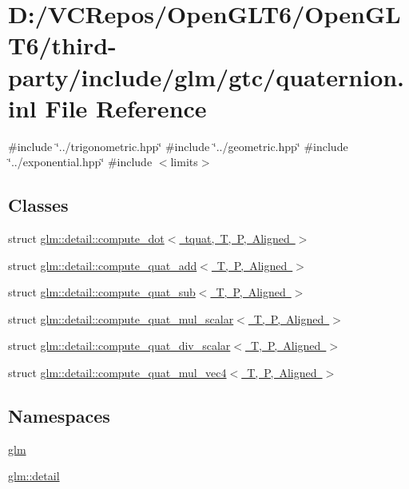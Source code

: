 \hypertarget{gtc_2quaternion_8inl}{}\section{D\+:/\+V\+C\+Repos/\+Open\+G\+L\+T6/\+Open\+G\+L\+T6/third-\/party/include/glm/gtc/quaternion.inl File Reference}
\label{gtc_2quaternion_8inl}
{\ttfamily \#include \char`\"{}../trigonometric.\+hpp\char`\"{}}\newline
{\ttfamily \#include \char`\"{}../geometric.\+hpp\char`\"{}}\newline
{\ttfamily \#include \char`\"{}../exponential.\+hpp\char`\"{}}\newline
{\ttfamily \#include $<$limits$>$}\newline
\subsection*{Classes}
\begin{DoxyCompactItemize}
\item 
struct \mbox{\hyperlink{structglm_1_1detail_1_1compute__dot_3_01tquat_00_01_t_00_01_p_00_01_aligned_01_4}{glm\+::detail\+::compute\+\_\+dot$<$ tquat, T, P, Aligned $>$}}
\item 
struct \mbox{\hyperlink{structglm_1_1detail_1_1compute__quat__add}{glm\+::detail\+::compute\+\_\+quat\+\_\+add$<$ T, P, Aligned $>$}}
\item 
struct \mbox{\hyperlink{structglm_1_1detail_1_1compute__quat__sub}{glm\+::detail\+::compute\+\_\+quat\+\_\+sub$<$ T, P, Aligned $>$}}
\item 
struct \mbox{\hyperlink{structglm_1_1detail_1_1compute__quat__mul__scalar}{glm\+::detail\+::compute\+\_\+quat\+\_\+mul\+\_\+scalar$<$ T, P, Aligned $>$}}
\item 
struct \mbox{\hyperlink{structglm_1_1detail_1_1compute__quat__div__scalar}{glm\+::detail\+::compute\+\_\+quat\+\_\+div\+\_\+scalar$<$ T, P, Aligned $>$}}
\item 
struct \mbox{\hyperlink{structglm_1_1detail_1_1compute__quat__mul__vec4}{glm\+::detail\+::compute\+\_\+quat\+\_\+mul\+\_\+vec4$<$ T, P, Aligned $>$}}
\end{DoxyCompactItemize}
\subsection*{Namespaces}
\begin{DoxyCompactItemize}
\item 
 \mbox{\hyperlink{namespaceglm}{glm}}
\item 
 \mbox{\hyperlink{namespaceglm_1_1detail}{glm\+::detail}}
\end{DoxyCompactItemize}
